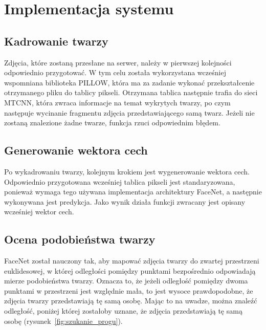 \chapter{Implementacja systemu}


\section{Kadrowanie twarzy}

Zdjęcia, które zostaną przesłane na serwer, należy w pierwszej kolejności odpowiednio przygotować.
W tym celu została wykorzystana wcześniej wspomniana biblioteka PILLOW,
która ma za zadanie wykonać przekształcenie otrzymanego pliku do tablicy pikseli.
Otrzymana tablica następnie trafia do sieci MTCNN, która zwraca informacje na temat wykrytych twarzy,
po czym następuje wycinanie fragmentu zdjęcia przedstawiającego samą twarz.
Jeżeli nie zostaną znalezione żadne twarze, funkcja rzuci odpowiednim błędem.


\section{Generowanie wektora cech}

Po wykadrowaniu twarzy, kolejnym krokiem jest wygenerowanie wektora cech.
Odpowiednio przygotowana wcześniej tablica pikseli jest standaryzowana,
ponieważ wymaga tego używana implementacja architektury FaceNet, a następnie wykonywana jest predykcja.
Jako wynik działa funkcji zwracany jest opisany wcześniej wektor cech.


\pagebreak


\section{Ocena podobieństwa twarzy}

FaceNet został nauczony tak, aby mapować zdjęcia twarzy do zwartej przestrzeni euklidesowej,
w której odległości pomiędzy punktami bezpośrednio odpowiadają mierze podobieństwa twarzy.
Oznacza to, że jeżeli odległość pomiędzy dwoma punktami w przestrzeni
jest względnie mała, to jest wysoce prawdopodobne, że zdjęcia twarzy przedstawiają tę samą osobę.
Mając to na uwadze, można znaleźć odległość, poniżej której zostałoby uznane, że zdjęcia
przedstawiają tę samą osobę (rysunek~\ref{fig:szukanie_progu}).

